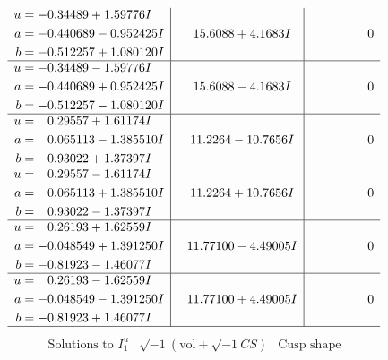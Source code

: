 \documentclass[1p]{elsarticle_modified}
\theoremstyle{definition}
\newcommand{\I}{\sqrt{-1}}
\begin{document}
$$\begin{array}{c|c|c}
\begin{aligned}
u &= -0.34489 + 1.59776 I \\
a &= -0.440689 - 0.952425 I \\
b &= -0.512257 + 1.080120 I\end{aligned}
 & \phantom{-}15.6088 + 4.1683 I & \phantom{-0.000000 } 0 \\ \hline\begin{aligned}
u &= -0.34489 - 1.59776 I \\
a &= -0.440689 + 0.952425 I \\
b &= -0.512257 - 1.080120 I\end{aligned}
 & \phantom{-}15.6088 - 4.1683 I & \phantom{-0.000000 } 0 \\ \hline\begin{aligned}
u &= \phantom{-}0.29557 + 1.61174 I \\
a &= \phantom{-}0.065113 - 1.385510 I \\
b &= \phantom{-}0.93022 + 1.37397 I\end{aligned}
 & \phantom{-}11.2264 - 10.7656 I & \phantom{-0.000000 } 0 \\ \hline\begin{aligned}
u &= \phantom{-}0.29557 - 1.61174 I \\
a &= \phantom{-}0.065113 + 1.385510 I \\
b &= \phantom{-}0.93022 - 1.37397 I\end{aligned}
 & \phantom{-}11.2264 + 10.7656 I & \phantom{-0.000000 } 0 \\ \hline\begin{aligned}
u &= \phantom{-}0.26193 + 1.62559 I \\
a &= -0.048549 + 1.391250 I \\
b &= -0.81923 - 1.46077 I\end{aligned}
 & \phantom{-}11.77100 - 4.49005 I & \phantom{-0.000000 } 0 \\ \hline\begin{aligned}
u &= \phantom{-}0.26193 - 1.62559 I \\
a &= -0.048549 - 1.391250 I \\
b &= -0.81923 + 1.46077 I\end{aligned}
 & \phantom{-}11.77100 + 4.49005 I & \phantom{-0.000000 } 0\\
 \hline 
 \end{array}$$\newpage$$\begin{array}{c|c|c}  
\text{Solutions to }I^u_{1}& \I (\text{vol} + \sqrt{-1}CS) & \text{Cusp shape}\\
 \hline 
\begin{aligned}

\end{aligned}
\end{array}$$
\end{document}
